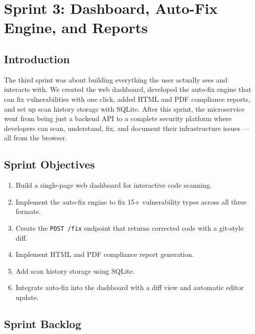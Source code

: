 
\chapter{Sprint 3: Dashboard, Auto-Fix Engine, and Reports}
\label{chap:sprint3}

\section{Introduction}

The third sprint was about building everything the user actually sees and interacts with. We created the web dashboard, developed the auto-fix engine that can fix vulnerabilities with one click, added HTML and PDF compliance reports, and set up scan history storage with SQLite. After this sprint, the microservice went from being just a backend API to a complete security platform where developers can scan, understand, fix, and document their infrastructure issues --- all from the browser.


\section{Sprint Objectives}

\begin{enumerate}[leftmargin=1.5cm]
  \item Build a single-page web dashboard for interactive code scanning.
  \item Implement the auto-fix engine to fix 15+ vulnerability types across all three formats.
  \item Create the \texttt{POST /fix} endpoint that returns corrected code with a git-style diff.
  \item Implement HTML and PDF compliance report generation.
  \item Add scan history storage using SQLite.
  \item Integrate auto-fix into the dashboard with a diff view and automatic editor update.
\end{enumerate}


\section{Sprint Backlog}

